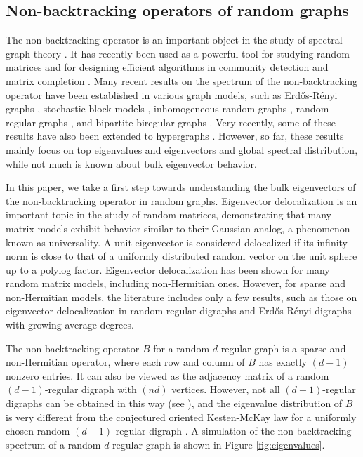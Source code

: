 \documentclass[11pt,reqno]{amsart}
\theoremstyle{definition}
\begin{document}
\subsection{Non-backtracking operators of random graphs}
The non-backtracking operator is an important object in the study of spectral graph theory \cite{terras2010zeta,angel2015non,bass_iharaselberg_1992,kempton2016non,glover2021some,mulas2024there,jost2023spectral,torres2021nonbacktracking}. It has recently been used as a powerful tool for studying random matrices \cite{bordenave2018nonbacktracking,bordenave2020new,benaych2020spectral} and for designing efficient algorithms in community detection and matrix completion \cite{krzakala2013spectral,bordenave2018nonbacktracking,stephan2020non,bordenave2020detection,stephan2022sparse,stephan2023non}. Many recent results on the spectrum of the non-backtracking operator have been established in various graph models, such as Erdős-Rényi graphs \cite{wang2017limiting}, stochastic block models \cite{bordenave2018nonbacktracking,coste2021eigenvalues}, inhomogeneous random graphs \cite{benaych2020spectral,dumitriu2022extreme}, random regular graphs \cite{bordenave2020new}, and bipartite biregular graphs \cite{brito2021spectral}. Very recently, some of these results have also been extended to hypergraphs \cite{dumitriu2021spectra,stephan2022sparse,chodrow2023nonbacktracking}. However, so far, these results mainly focus on top eigenvalues and eigenvectors and global spectral distribution, while not much is known about bulk eigenvector behavior.  

In this paper, we take a first step towards understanding the bulk eigenvectors of the non-backtracking operator in random graphs. Eigenvector delocalization is an important topic in the study of random matrices, demonstrating that many matrix models exhibit behavior similar to their Gaussian analog, a phenomenon known as universality. A unit eigenvector is considered delocalized if its infinity norm is close to that of a uniformly distributed random vector on the unit sphere up to a polylog factor. Eigenvector delocalization has been shown for many random matrix models, including non-Hermitian ones. However, for sparse and non-Hermitian models, the literature includes only a few results, such as those on eigenvector delocalization in random regular digraphs \cite{litvak2019structure} and Erdős-Rényi digraphs \cite{he2023edge} with growing average degrees.

The non-backtracking operator \( B \) for a random \( d \)-regular graph is a sparse and non-Hermitian operator, where each row and column of \( B \) has {exactly} \( (d-1) \) nonzero entries. It can also be viewed as the adjacency matrix of a random \( (d-1) \)-regular digraph with \( (nd) \) vertices. However, not all \( (d-1) \)-regular digraphs can be obtained in this way (see \cite[Theorem 2.3]{mulas2024there}), and the eigenvalue distribution of $B$ is very different from the conjectured oriented Kesten-McKay law for a uniformly chosen random \( (d-1) \)-regular digraph \cite{bordenave2012around}. A simulation of the non-backtracking spectrum of a random $d$-regular graph is shown in Figure \ref{fig:eigenvalues}.
\end{document}
